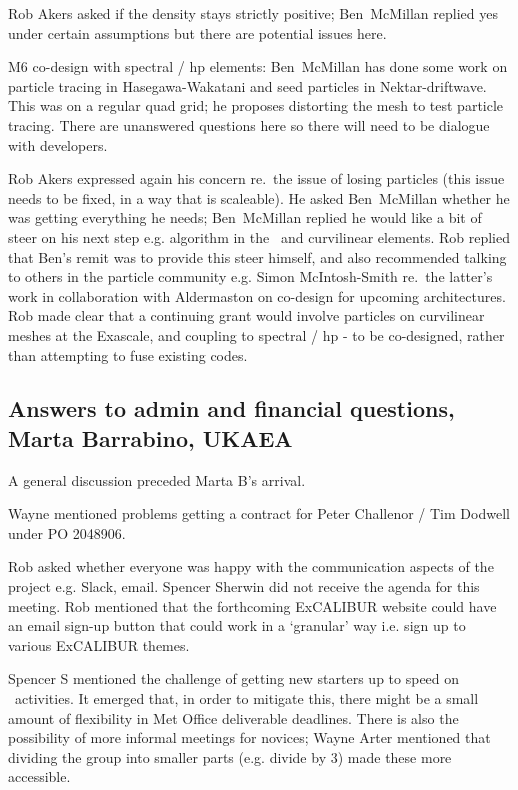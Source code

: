 Rob Akers asked if the density stays strictly positive; Ben~McMillan replied yes under 
certain assumptions but there are potential issues here.

M6 co-design with spectral / hp elements: Ben~McMillan has done some work on particle 
tracing in Hasegawa-Wakatani and seed particles in Nektar-driftwave.  This was 
on a regular quad grid; he proposes distorting the mesh to test particle 
tracing.  There are unanswered questions here so there will need to be dialogue 
with  developers.

Rob Akers expressed again his concern re.\ the issue of losing particles (this 
issue needs to be fixed, in a way that is scaleable).  He asked Ben~McMillan whether 
he was getting everything he needs; Ben~McMillan replied he would like a bit of steer 
on his next step e.g. algorithm in the \papp\  and curvilinear elements.  Rob 
replied that Ben's remit was to provide this steer himself, and also 
recommended talking to others in the particle community e.g. Simon 
McIntosh-Smith re.\ the latter's work in collaboration with Aldermaston on 
co-design for upcoming architectures.  Rob made clear that a continuing grant 
would involve particles on curvilinear meshes at the Exascale, and coupling to 
spectral / hp - to be co-designed, rather than attempting to fuse existing 
codes.

\subsection{Answers to admin and financial questions, Marta Barrabino, UKAEA}

A general discussion preceded Marta B's arrival.

Wayne mentioned problems getting a contract for Peter Challenor / Tim Dodwell
under PO 2048906.

Rob asked whether everyone was happy with the communication aspects of the 
project e.g. Slack, email.  Spencer Sherwin did not receive the agenda for this 
meeting.  Rob mentioned that the forthcoming ExCALIBUR website could have an 
email sign-up button that could work in a `granular' way i.e. sign up to 
various ExCALIBUR themes.

Spencer S mentioned the challenge of getting new starters up to speed on 
\nep\  activities.  It emerged that, in order to mitigate this, there might be 
a small amount of flexibility in Met Office deliverable deadlines.  There is 
also the possibility of more informal meetings for novices; Wayne Arter 
mentioned that dividing the group into smaller parts (e.g. divide by 3) made 
these more accessible.

